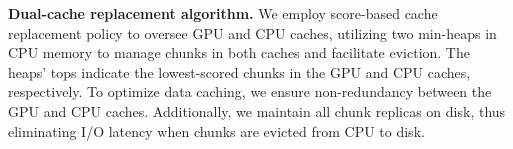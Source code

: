 %

\noindent \textbf{Dual-cache replacement algorithm.}
We employ score-based cache replacement policy to oversee GPU and CPU caches, utilizing two min-heaps in CPU memory to manage chunks in both caches and facilitate eviction. The heaps' tops indicate the lowest-scored chunks in the GPU and CPU caches, respectively. To optimize data caching, we ensure non-redundancy between the GPU and CPU caches. Additionally, we maintain all chunk replicas on disk, thus eliminating I/O latency when chunks are evicted from CPU to disk.

